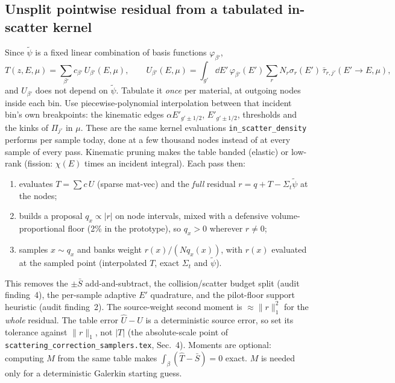 \documentclass[11pt]{article}
\newcommand{\tpsi}{\tilde\psi}
\newcommand{\Sbar}{\bar S}
\newcommand{\Sigt}{\Sigma_t}
\begin{document}
\subsection{Unsplit pointwise residual from a tabulated in-scatter kernel}
Since $\tpsi$ is a fixed linear combination of basis functions $\varphi_{\beta'}$,
\begin{equation}
  T(z,E,\mu)=\sum_{\beta'}c_{\beta'}\,U_{\beta'}(E,\mu),\qquad
  U_{\beta'}(E,\mu)=\int_{g'}\dd E'\,\varphi_{\beta'}(E')\sum_rN_r\sigma_r(E')\,
  \bar\tau_{r,j'}(E'\!\to E,\mu),
\end{equation}
and $U_{\beta'}$ does not depend on $\tpsi$. Tabulate it \emph{once} per material, at
outgoing nodes inside each bin. Use piecewise-polynomial interpolation between that
incident bin's own breakpoints: the kinematic edges $\alpha E'_{g'\pm1/2}$,
$E'_{g'\pm1/2}$, thresholds and the kinks of $\Pi_{j'}$ in $\mu$. These are the same
kernel evaluations \texttt{in\_scatter\_density} performs per sample today, done at a
few thousand nodes instead of at every sample of every pass. Kinematic pruning makes
the table banded (elastic) or low-rank (fission: $\chi(E)$ times an incident integral).
Each pass then:
\begin{enumerate}
  \item evaluates $T=\sum c\,U$ (sparse mat-vec) and the \emph{full} residual
  $r=q+T-\Sigt\tpsi$ at the nodes;
  \item builds a proposal $q_x\propto|r|$ on node intervals, mixed with a defensive
  volume-proportional floor (2\% in the prototype), so $q_x>0$ wherever $r\neq0$;
  \item samples $x\sim q_x$ and banks weight $r(x)/(N q_x(x))$, with $r(x)$ evaluated at
  the sampled point (interpolated $T$, exact $\Sigt$ and $\tpsi$).
\end{enumerate}
This removes the $\pm\Sbar$ add-and-subtract, the collision/scatter budget split (audit
finding~4), the per-sample adaptive $E'$ quadrature, and the pilot-floor support
heuristic (audit finding~2). The source-weight second moment is $\approx\|r\|_1^2$ for
the \emph{whole} residual. The table error $\hat U-U$ is a deterministic source error,
so set its tolerance against $\|r\|_1$, not $|T|$ (the absolute-scale point of
\texttt{scattering\_correction\_samplers.tex}, Sec.~4). Moments are optional: computing
$M$ from the same table makes $\int_\beta(\hat T-\Sbar)=0$ exact. $M$ is needed only for
a deterministic Galerkin starting guess.
\end{document}
